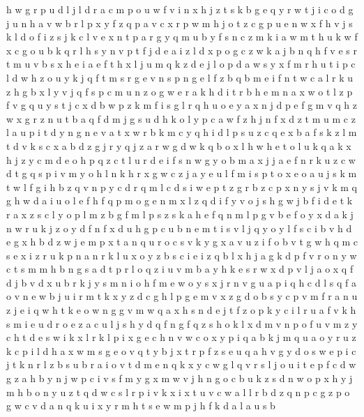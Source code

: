\documentclass{article}
\begin{document}
h w g r p u d l j
l d r a c m p o u w f v i n x h j z t s k b g e q y
r w t j
i c o d g j u n h a v w b r l p x y f z q
p
a v c x r p w m h j o t z
c g p u e n w x f h v j s k l d o
f i z s j k c l v e x n t p a r g y q m
u b y f s n c z m k i a w
m t h u k w f
x c g o u b k q r l h s y n v p t f j d e a i z
l d x p o g c z w k a j b n q h f v e s r t m u
v b s x h e
i a e f t h x l j u m q k z d
e j l o p d a w s y x f m r h u t i
p c l d w h z o u y k j q f t m s r g e v n
s p n g e l f z b
q b m e i f n t w c a l r k u z h g
b x l y v j q f s p c m u n z o g w e r a k h d i t
r b h e m n a x w o t l z p f v g q u y s
t j c x d b w p z k m f i s g l r q h u o e y a
x n j d p e f g m v q h z w
x g r z n u t b a q f d
m j g s u d h k o l y p c a w f z
h j n f x d z t m u
m c z l a u p i t d y n g
n e v a t x w r b k m c y q h i d l p s u z
c q e x b a f s k z l m t d v
k s c x a b d z g j r
y q j z a r w
g d w k q b o x l h
w h e t o l u k
q a k x h j z y c m d e o
h p q z c t l u r d e i f s n w g y o b m a x j
j a e f n r k u z c w d t g q s p i v m y o h l
n k h r x g w c z j a y e u l f m i s p t o
x e o a u j s k m t w l f g i h b z q v n p y c d r
q m l c d s i w e p t z g
r b z c p x n y s j v k m q g h w d a i u o l e f
h f q p m o g e n
m x l z q d i f y v o j s h g
w j b f i d e t k r a x z s c l y o
p l m z b g
f m l p s
z s k a h e f q n m l p g
v b e f o y x d a k j n
w r u k j z o y d f n
f x d u
h g p c u b n e m t i s v l j q y
o y l f s c i b v h d e g x
h b d z w j e m p x t a n q u r o c s v k
y g x a v u z i
f o b v t g w h q m c s e x i z r u k p n a
n r k l u x o y z b s c i
e i z q b l x h j a g k d p f v r o n y w c t s m
m h b n g s a d t p r l o q z i u v
m b a y
h k e s r w x d p v l j a o
x q f d j b v
d x u b r k j y s m n i o h f
m e w o y s x j r n v g u a p i q h c d l
s q f a o v n e w b j u i r m t k x y z d c g h l p
g e m v x z
g d o b s y c p v m f r a n u z j e i q w h t k
e o w n g
g v m w q a x h s n d e j t f z o p k y c i l r u
a f v k h s m i e u d r o
e z a c u l j s h y d q f
n g f q z s h o k l x d m v
n p o f u v m z y c h t d e s w i k x l r
k l p i x g e c h n v w
c o x y p i q a b k j m
q u a o y
r u z k c p i l d h a x w m s g e o v q t y b j
x t r p f z s
e
u q a h v g y d o s w e p i c j t k n r l z b
s u b r a i o v t d m e n q k x y c w g l
q v r s l j o u i t e p f c d w g z a h b y n
j w p c i v s f m y g x
m w v j h n g o c b u k z
s d n w o p x
h y j
m h b o n y u z t q d w c s l r p i v k x
i x t u v c w a
l
l r b d z q n p c g
z p o g w c v d a n q k u i x y r m h t s
e w
m p j h f k d a l
a u s b
\end{document}
